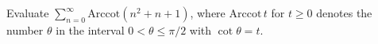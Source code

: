 Evaluate $\sum_{n=0}^\infty \mathrm{Arccot}(n^2+n+1)$, where
$\mathrm{Arccot}\,t$ for $t \geq 0$ denotes the number $\theta$ in the
interval $0 < \theta \leq \pi/2$ with $\cot \theta = t$.
